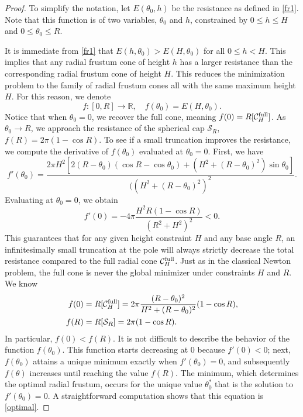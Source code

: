 \documentclass[a4paper,12pt]{amsart}
\theoremstyle{plain}
\theoremstyle{definition}
\def\r{\mathbb R}
\def\S{\mathcal S}
\begin{document}
\begin{proof}
 To simplify the notation, let $E(\theta_0,h)$ be the resistance as defined in \eqref{fr1}. Note that this function is of two variables, $\theta_0$ and $h$, constrained by    $0\leq h\leq H$ and $0\leq \theta_0\leq R$. 
 
It is immediate from \eqref{fr1} that $E(h,\theta_0)> E(H,\theta_0)$ for all $0\leq h<H$. This implies that any radial frustum cone of height $h$ has a larger resistance than the corresponding radial frustum cone of height $H$. This reduces the minimization problem  to the family of radial frustum cones all with the same maximum height $H$. For this reason, we denote 
$$f\colon [0,R]\to\r,\quad f(\theta_0)=E(H,\theta_0).$$ 
 Notice that when $\theta_0=0$, we recover the full cone, meaning $f(0)=R[\mathcal{C}^{\rm full}_H]$. As $\theta_0\to R$, we approach the resistance of the spherical cap $\S_R$, $f(R)= 2\pi(1-\cos R)$. To see if a small truncation improves the resistance, we compute the derivative of $f(\theta_0)$ evaluated at $\theta_0 = 0$. First, we have
\begin{equation*}
 f'(\theta_0) = \frac{2\pi H^2 \left[ 2(R-\theta_0)(\cos R-\cos\theta_0)+(H^2+(R-\theta_0)^2)\sin\theta_0\right]}{((H^2+(R-\theta_0)^2)^2}.
\end{equation*}
Evaluating at $\theta_0 = 0$, we obtain
\begin{equation*}
 f'(0) = - 4\pi \frac{H^2 R (1 - \cos R)}{(R^2 + H^2)^2}<0.
\end{equation*}
This guarantees that for any given height constraint $H$ and any base angle $R$, an infinitesimally small truncation at the pole will always strictly decrease the total resistance compared to the full radial cone $\mathcal{C}_H^{\rm full}$. Just as in the classical Newton problem, the full cone is never the global minimizer under constraints $H$ and $R$. We know 
\begin{equation*}
\begin{split}
f(0)&=R[\mathcal{C}^{\rm full}_H]=2\pi\frac{(R-\theta_0)^2}{H^2+(R-\theta_0)^2}(1-\cos R),\\
 f(R)&=R[\S_R]=2\pi(1-\cos R).
 \end{split}
 \end{equation*}
In particular, $f(0)<f(R)$. It is not difficult to describe the behavior of the function $f(\theta_0)$. This function starts decreasing at $0$ because $f'(0)<0$; next, $f(\theta_0)$ attains a unique minimum exactly when $f'(\theta_0)=0$, and subsequently $f(\theta)$ increases until reaching the value $f(R)$. The minimum, which determines the optimal radial frustum, occurs for the unique value $\theta_0^*$ that is the solution to $f'(\theta_0)=0$. A straightforward computation shows that this equation is \eqref{optimal}.
\end{proof}
 
\end{document}
